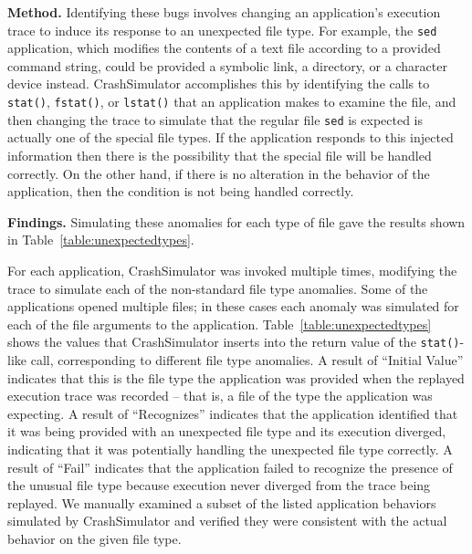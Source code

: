 {\bf Method.}  Identifying these bugs involves changing an application's
execution trace to induce its response to an unexpected file type.  For
example, the {\tt sed} application, which modifies the contents of a text
file according to a provided command string, could be provided a symbolic
link, a directory, or a character device instead.  CrashSimulator
accomplishes this by identifying the calls to {\tt stat()}, {\tt fstat()},
or {\tt lstat()} that an application makes to examine the file, and then
changing the trace to simulate that the regular file {\tt sed} is expected
is actually one of the special file types.  If the application responds to
this injected information then there is the possibility that the special
file will be handled correctly.  On the other hand, if there is no
alteration in the behavior of the application,  then the condition is not
being handled correctly.

{\bf Findings.}
Simulating these anomalies for each type of file
gave the results shown in Table~\ref{table:unexpectedtypes}.

For each application, CrashSimulator was invoked multiple times, modifying
the trace to simulate each of the non-standard file type anomalies.  Some
of the applications opened multiple files; in these cases each anomaly was
simulated for each of the file arguments to the application.
Table~\ref{table:unexpectedtypes} shows the values that CrashSimulator
inserts into the return value of the {\tt stat()}-like call, corresponding
to different file type anomalies.  A result of ``Initial Value'' indicates
that this is the file type the application was provided when the replayed
execution trace was recorded -- that is, a file of the type the application
was expecting.  A result of ``Recognizes'' indicates that the application
identified that it was being provided with an unexpected file type and its
execution diverged, indicating that it was potentially handling the
unexpected file type correctly.  A result of ``Fail'' indicates that the
application failed to recognize the presence of the unusual file type
because execution never diverged from the trace being replayed.  We
manually examined a subset of the listed application behaviors simulated by
CrashSimulator and verified they were consistent with the actual behavior
on the given file type.

